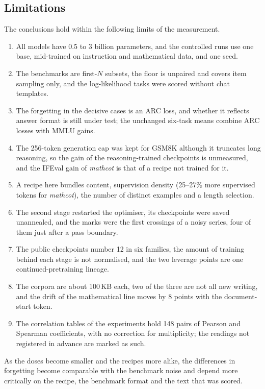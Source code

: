 \documentclass[11pt,a4paper]{article}
\theoremstyle{definition}
\newcommand{\mathcot}{\textit{mathcot}}
\begin{document}
\subsection{Limitations}

The conclusions hold within the following limits of the measurement.
\begin{enumerate}
\item All models have 0.5 to 3 billion parameters, and the controlled runs use one base, mid-trained on
instruction and mathematical data, and one seed.
\item The benchmarks are first-$N$ subsets, the floor is unpaired and covers item sampling only, and the
log-likelihood tasks were scored without chat templates.
\item The forgetting in the decisive cases is an ARC loss, and whether it reflects answer format is still under
test; the unchanged six-task means combine ARC losses with MMLU gains.
\item The 256-token generation cap was kept for GSM8K although it truncates long reasoning, so the gain of the
reasoning-trained checkpoints is unmeasured, and the IFEval gain of \mathcot{} is that of a recipe not trained for
it.
\item A recipe here bundles content, supervision density (25--27\% more supervised tokens for \mathcot{}), the
number of distinct examples and a length selection.
\item The second stage restarted the optimiser, its checkpoints were saved unannealed, and the marks were the
first crossings of a noisy series, four of them just after a pass boundary.
\item The public checkpoints number 12 in six families, the amount of training behind each stage is not
normalised, and the two leverage points are one continued-pretraining lineage.
\item The corpora are about 100\,KB each, two of the three are not all new writing, and the drift of the
mathematical line moves by 8 points with the document-start token.
\item The correlation tables of the experiments hold 148 pairs of Pearson and Spearman coefficients, with no
correction for multiplicity; the readings not registered in advance are marked as such.
\end{enumerate}
As the doses become smaller and the recipes more alike, the differences in forgetting become comparable with the
benchmark noise and depend more critically on the recipe, the benchmark format and the text that was scored.
\end{document}
